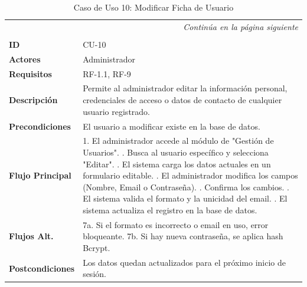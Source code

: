 \clearpage
\begin{longtable}{p{} p{}}
    \toprule
    \endfirsthead
    \toprule
    \endhead
    \midrule
    \multicolumn{2}{r}{\small\itshape Continúa en la página siguiente} \\
    \endfoot
    \bottomrule
    \noalign{\vspace{0.5cm}}
    \caption{Caso de Uso 10: Modificar Ficha de Usuario} \label{cu:10} \\
    \endlastfoot

    \textbf{ID} & CU-10 \\ \midrule
    \textbf{Actores} & Administrador \\ \midrule
    \textbf{Requisitos} & RF-1.1, RF-9 \\ \midrule
    \textbf{Descripción} & Permite al administrador editar la información personal, credenciales de acceso o datos de contacto de cualquier usuario registrado. \\ \midrule
    \textbf{Precondiciones} & El usuario a modificar existe en la base de datos. \\ \midrule
    \textbf{Flujo Principal} & 
    1. El administrador accede al módulo de "Gestión de Usuarios". \newline
    2. Busca al usuario específico y selecciona "Editar". \newline
    3. El sistema carga los datos actuales en un formulario editable. \newline
    4. El administrador modifica los campos (Nombre, Email o Contraseña). \newline
    5. Confirma los cambios. \newline
    6. El sistema valida el formato y la unicidad del email. \newline
    7. El sistema actualiza el registro en la base de datos. \\ \midrule
    \textbf{Flujos Alt.} & 
    7a. Si el formato es incorrecto o email en uso, error bloqueante. \newline
    7b. Si hay nueva contraseña, se aplica hash Bcrypt. \\ \midrule
    \textbf{Postcondiciones} & Los datos quedan actualizados para el próximo inicio de sesión. \\
\end{longtable}


